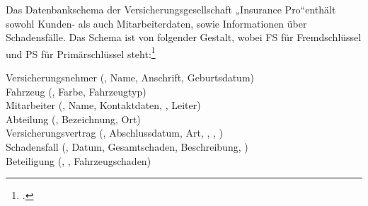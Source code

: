 \documentclass{bschlangaul-aufgabe}
\begin{document}

Das Datenbankschema der Versicherungsgesellschaft „Insurance Pro“enthält
sowohl Kunden- als auch Mitarbeiterdaten, sowie Informationen über
Schadensfälle. Das Schema ist von folgender Gestalt, wobei FS für
Fremdschlüssel und PS für Primärschlüssel steht:\footcite[Aufgabe 4: SQL
(Check-Up)]{db:ab:4}

\bigskip

{
\ttfamily
\noindent
Versicherungsnehmer (, Name, Anschrift, Geburtsdatum)\\

\noindent
Fahrzeug (, Farbe, Fahrzeugtyp)\\

\noindent
Mitarbeiter (, Name, Kontaktdaten, ,
Leiter)\\

\noindent
Abteilung (, Bezeichnung, Ort)\\

\noindent
Versicherungsvertrag (, Abschlussdatum, Art,
, ,
)\\

\noindent
Schadensfall (, Datum, Gesamtschaden, Beschreibung,
)\\

\noindent
Beteiligung (, ,
Fahrzeugschaden)}

\bigskip
\end{document}
